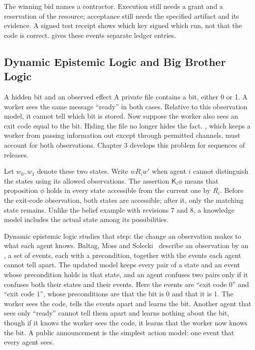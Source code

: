 The winning bid names a contractor. Execution still needs a grant and a
reservation of the resource; acceptance still needs the specified artifact and
its evidence. A signed test receipt shows which key signed which run, not that
the code is correct.  gives these events separate ledger entries.

\subsection{Dynamic Epistemic Logic and Big Brother Logic}

\begin{pdexample}{A hidden bit and an observed effect}
A private file contains a bit, either 0 or 1. A worker sees the same message
``ready'' in both cases. Relative to this observation model, it cannot tell
which bit is stored. Now suppose the worker also sees an exit code equal to
the bit. Hiding the file no longer hides the fact. ,
which keeps a worker from passing information out except through permitted
channels, must account for both observations. Chapter 3 develops this problem for sequences of releases.
\end{pdexample}

Let $w_0,w_1$ denote these two states. Write $w R_i w'$ when agent $i$ cannot
distinguish the states using its allowed observations. The assertion $\mathsf{K}_i\phi$
means that proposition $\phi$ holds in every state accessible from the current
one by $R_i$. Before the exit-code observation, both states are accessible;
after it, only the matching state remains. Unlike the belief example with
revisions 7 and 8, a knowledge model includes the actual state among its
possibilities.

Dynamic epistemic logic studies that step: the change an observation makes to
what each agent knows. Baltag, Moss and Solecki~
describe an observation by an , a set of events, each with
a precondition, together with the events each agent cannot tell apart. The
updated model keeps every pair of a state and an event whose precondition
holds in that state, and an agent confuses two pairs only if it confuses both
their states and their events. Here the events are ``exit code 0'' and ``exit
code 1'', whose preconditions are that the bit is 0 and that it is 1. The
worker sees the code, tells the events apart and learns the bit. Another agent
that sees only ``ready'' cannot tell them apart and learns nothing about the
bit, though if it knows the worker sees the code, it learns that the worker
now knows the bit. A public announcement is the simplest action model: one
event that every agent sees.

